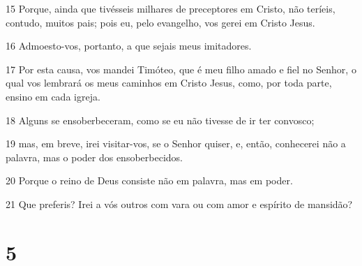 \par 15 Porque, ainda que tivésseis milhares de preceptores em Cristo, não teríeis, contudo, muitos pais; pois eu, pelo evangelho, vos gerei em Cristo Jesus.
\par 16 Admoesto-vos, portanto, a que sejais meus imitadores.
\par 17 Por esta causa, vos mandei Timóteo, que é meu filho amado e fiel no Senhor, o qual vos lembrará os meus caminhos em Cristo Jesus, como, por toda parte, ensino em cada igreja.
\par 18 Alguns se ensoberbeceram, como se eu não tivesse de ir ter convosco;
\par 19 mas, em breve, irei visitar-vos, se o Senhor quiser, e, então, conhecerei não a palavra, mas o poder dos ensoberbecidos.
\par 20 Porque o reino de Deus consiste não em palavra, mas em poder.
\par 21 Que preferis? Irei a vós outros com vara ou com amor e espírito de mansidão?

\chapter{5}

